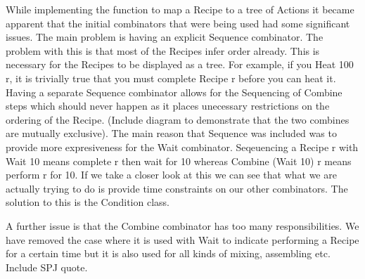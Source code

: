 While implementing the function to map a Recipe to a tree of Actions it became apparent that the initial
combinators that were being used had some significant issues. The main problem is having an explicit Sequence
combinator. The problem with this is that most of the Recipes infer order already. This is necessary for the
Recipes to be displayed as a tree. For example, if you Heat 100 r, it is trivially true that you must complete
Recipe r before you can heat it. Having a separate Sequence combinator allows for the Sequencing of Combine steps
which should never happen as it places unecessary restrictions on the ordering of the Recipe. (Include diagram
to demonstrate that the two combines are mutually exclusive). The main reason that Sequence was included was to
provide more expresiveness for the Wait combinator. Seqeuencing a Recipe r with Wait 10 means complete r then
wait for 10 whereas Combine (Wait 10) r means perform r for 10. If we take a closer look at this we can see that
what we are actually trying to do is provide time constraints on our other combinators. The solution to this is
the Condition class.

A further issue is that the Combine combinator has too many responsibilities. We have removed the case where it
is used with Wait to indicate performing a Recipe for a certain time but it is also used for all kinds of mixing,
assembling etc. Include SPJ quote.

